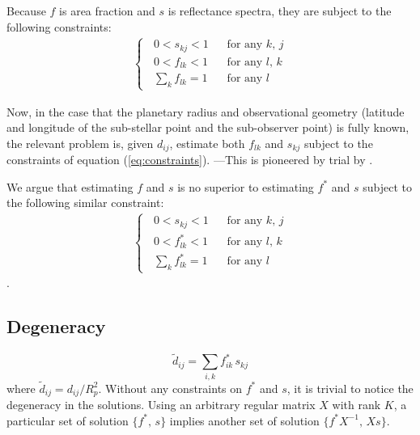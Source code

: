 \documentclass[iop,numberedappendix,apj,]{emulateapj}
\def\memoYF#1{\color{red}{\bf [#1]}\color{black}}
\begin{document}
Because $f$ is area fraction and $s$ is reflectance spectra, they are subject to the following constraints:
\begin{eqnarray}
\begin{cases}
\;\; 0 < s_{kj} < 1 \;\;\; & \mbox{for any $k$, $j$} \\
\;\; 0 < f_{lk} < 1 \;\;\; & \mbox{for any $l$, $k$} \\
\;\; \sum_k f_{lk} = 1 & \mbox{for any $l$} 
\end{cases}
\label{eq:constraints}
\end{eqnarray}

Now, in the case that the planetary radius and observational geometry (latitude and longitude of the sub-stellar point and the sub-observer point) is fully known, the relevant problem is, given $d_{ij}$, estimate both $f_{lk}$ and $s_{kj}$ subject to the constraints of equation (\ref{eq:constraints}). 
---This is pioneered by trial by \citet{Cowan2013}. 

We argue that estimating $f$ and $s$ is no superior to estimating $f^*$ and $s$ subject to the following similar constraint:
\begin{eqnarray}
\begin{cases}
\;\; 0 < s_{kj} < 1 \;\;\; & \mbox{for any $k$, $j$} \\
\;\; 0 < f^{\ast }_{lk} < 1 \;\;\; & \mbox{for any $l$, $k$} \\
\;\; \sum_k f_{lk}^{\ast } = 1 & \mbox{for any $l$} 
\end{cases}
\label{eq:constraints_ast}
\end{eqnarray}
\memoYF{write here}.

\subsection{Degeneracy}
\label{ss:degeneracy}


\begin{equation}
\tilde d_{ij} = \sum _{i,k} f_{ik}^{\ast } \, s_{kj}
\end{equation}
where $\tilde d_{ij} = d_{ij}/R_p^2$. 
Without any constraints on $f^{\ast }$ and $s$, it is trivial to notice the degeneracy in the solutions. 
Using an arbitrary regular matrix $X$ with rank $K$, a particular set of solution $\{ f^{\ast },\,s\}$ implies another set of solution $\{ f^{\ast }X^{-1},\,Xs\}$. 
\end{document}
